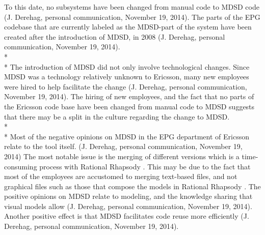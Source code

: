 \documentclass[final_report_innit.tex]{subfiles}
\begin{document}
To this date, no subsystems have been changed from manual code to MDSD code (J. Derehag, personal communication, November 19, 2014). The parts of the EPG codebase that are currently labeled as the MDSD-part of the system have been created after the introduction of MDSD, in 2008 (J. Derehag, personal communication, November 19, 2014). 
\\* 
\\* 
The introduction of MDSD did not only involve technological changes. Since MDSD was a technology relatively unknown to Ericsson, many new employees were hired to help facilitate the change (J. Derehag, personal communication, November 19, 2014). The hiring of new employees, and the fact that no parts of the Ericsson code base have been changed from manual code to MDSD suggests that there may be a split in the culture regarding the change to MDSD. 
\\* 
\\* 
Most of the negative opinions on MDSD in the EPG department of Ericsson relate to the tool \cite{rrf} itself. (J. Derehag, personal communication, November 19, 2014) The most notable issue is the merging of different versions which is a time-consuming process with Rational Rhapsody \cite{rrf}. This may be due to the fact that most of the employees are accustomed to merging text-based files, and not graphical files such as those that compose the models in Rational Rhapsody \cite{rrf}. The positive opinions on MDSD relate to modeling, and the knowledge sharing that visual models allow (J. Derehag, personal communication, November 19, 2014). Another positive effect is that MDSD facilitates code reuse more efficiently (J. Derehag, personal communication, November 19, 2014). 
\end{document}
